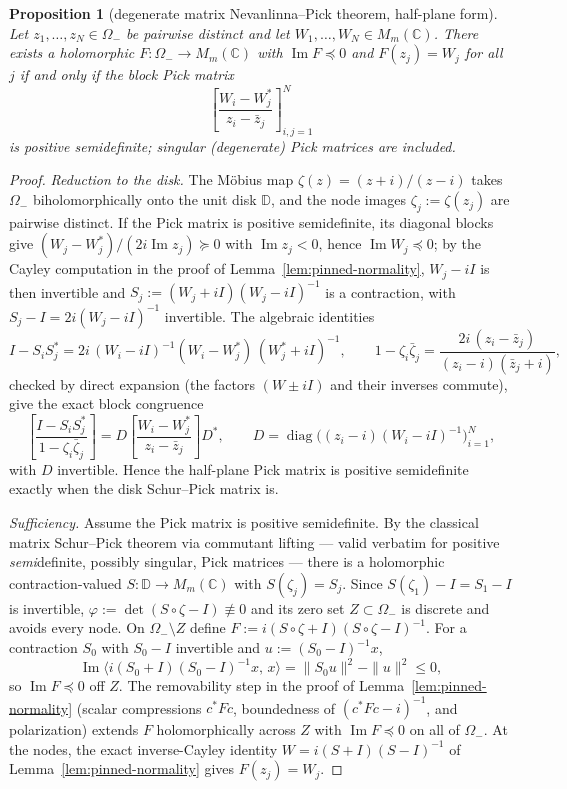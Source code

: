 \documentclass[11pt]{amsart}
\newtheorem{proposition}[theorem]{Proposition}
\theoremstyle{definition}
\theoremstyle{remark}
\theoremstyle{definition}
\renewcommand{\Im}{\operatorname{Im}}
\newcommand{\C}{\mathbb{C}}
\DeclareMathOperator{\diag}{diag}
\begin{document}
\begin{proposition}[degenerate matrix Nevanlinna--Pick theorem, half-plane form]\label{prop:np-degenerate}
Let $z_1,\ldots,z_N\in\Omega_-$ be pairwise distinct and let $W_1,\ldots,W_N\in M_m(\C)$.  There exists
a holomorphic $F:\Omega_-\to M_m(\C)$ with $\Im F\preceq0$ and $F(z_j)=W_j$ for all $j$ if and only if
the block Pick matrix
\[
   \left[\frac{W_i-W_j^*}{z_i-\bar z_j}\right]_{i,j=1}^N
\]
is positive \emph{semi}definite; singular (degenerate) Pick matrices are included.
\end{proposition}

\begin{proof}
\emph{Reduction to the disk.}  The M\"obius map $\zeta(z)=(z+i)/(z-i)$ takes $\Omega_-$ biholomorphically
onto the unit disk $\mathbb D$, and the node images $\zeta_j:=\zeta(z_j)$ are pairwise distinct.  If the Pick matrix is
positive semidefinite, its diagonal blocks give $(W_j-W_j^*)/(2i\Im z_j)\succeq0$ with $\Im z_j<0$, hence
$\Im W_j\preceq0$; by the Cayley computation in the proof of Lemma~\ref{lem:pinned-normality},
$W_j-iI$ is then invertible and $S_j:=(W_j+iI)(W_j-iI)^{-1}$ is a contraction, with
$S_j-I=2i(W_j-iI)^{-1}$ invertible.  The algebraic identities
\[
   I-S_iS_j^*
   =
   2i\,(W_i-iI)^{-1}(W_i-W_j^*)\,(W_j^*+iI)^{-1},
   \qquad
   1-\zeta_i\bar\zeta_j
   =
   \frac{2i\,(z_i-\bar z_j)}{(z_i-i)(\bar z_j+i)},
\]
checked by direct expansion (the factors $(W\pm iI)$ and their inverses commute), give the exact block
congruence
\[
   \left[\frac{I-S_iS_j^*}{1-\zeta_i\bar\zeta_j}\right]
   =
   D\left[\frac{W_i-W_j^*}{z_i-\bar z_j}\right]D^*,
   \qquad
   D=\diag\bigl((z_i-i)(W_i-iI)^{-1}\bigr)_{i=1}^N,
\]
with $D$ invertible.  Hence the half-plane Pick matrix is positive semidefinite exactly when the disk
Schur--Pick matrix is.

\emph{Sufficiency.}  Assume the Pick matrix is positive semidefinite.  By the classical matrix
Schur--Pick theorem via commutant lifting \cite{FoiasFrazho} --- valid verbatim for positive
\emph{semi}definite, possibly singular, Pick matrices --- there is a holomorphic contraction-valued
$S:\mathbb D\to M_m(\C)$ with $S(\zeta_j)=S_j$.  Since $S(\zeta_1)-I=S_1-I$ is invertible,
$\varphi:=\det(S\circ\zeta-I)\not\equiv0$ and its zero set $Z\subset\Omega_-$ is discrete and avoids
every node.  On $\Omega_-\setminus Z$ define $F:=i(S\circ\zeta+I)(S\circ\zeta-I)^{-1}$.  For a
contraction $S_0$ with $S_0-I$ invertible and $u:=(S_0-I)^{-1}x$,
\[
   \Im\langle i(S_0+I)(S_0-I)^{-1}x,\,x\rangle
   =
   \|S_0u\|^2-\|u\|^2\le0,
\]
so $\Im F\preceq0$ off $Z$.  The removability step in the proof of
Lemma~\ref{lem:pinned-normality} (scalar compressions $c^*Fc$, boundedness of $(c^*Fc-i)^{-1}$, and
polarization) extends $F$ holomorphically across $Z$ with $\Im F\preceq0$ on all of $\Omega_-$.  At
the nodes, the exact inverse-Cayley identity $W=i(S+I)(S-I)^{-1}$ of Lemma~\ref{lem:pinned-normality}
gives $F(z_j)=W_j$.


\end{proof}
\end{document}
